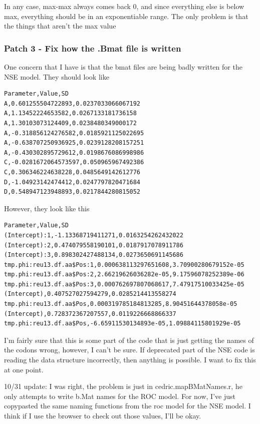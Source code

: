 In any case, max-max always comes back 0, and since everything else is below max, everything should be in an exponentiable range. The only problem is that the things that aren't the max value 

\subsubsection{Patch 3 - Fix how the .Bmat file is written}

One concern that I have is that the bmat files are being badly written for the NSE model. They should look like 

\begin{verbatim}
Parameter,Value,SD
A,0.601255504722893,0.0237033066067192
A,1.13452224653582,0.0267133181736158
A,1.30103073124409,0.0238480349000172
A,-0.318856124276582,0.0185921125022695
A,-0.638707250936925,0.0239128208157251
A,-0.430302895729612,0.0198676086998986
C,-0.0281672064573597,0.050965967492386
C,0.306346224638228,0.0485649142612776
D,-1.04923142474412,0.0247797820471684
D,0.548947123948893,0.0217844280815052
\end{verbatim}

However, they look like this

\begin{verbatim}
Parameter,Value,SD
(Intercept):1,-1.13368719411271,0.0163254262432022
(Intercept):2,0.474079558190101,0.0187917078911786
(Intercept):3,0.898302427488134,0.0273650691145686
tmp.phi:reu13.df.aa$Pos:1,0.000638113297651608,3.70900280679152e-05
tmp.phi:reu13.df.aa$Pos:2,2.66219626036282e-05,9.17596078252389e-06
tmp.phi:reu13.df.aa$Pos:3,0.000762697807068617,7.47917510033425e-05
(Intercept),0.407527027594279,0.0285214413558274
tmp.phi:reu13.df.aa$Pos,0.000319785184813285,8.90451644378058e-05
(Intercept),0.728372367207557,0.0119226668866337
tmp.phi:reu13.df.aa$Pos,-6.65911530134893e-05,1.09884115801929e-05
\end{verbatim}


I'm fairly sure that this is some part of the code that is just getting the names of the codons wrong, however, I can't be sure. If deprecated part of the NSE code is reading the data structure incorrectly, then anything is possible. I want to fix this at one point.

10/31 update: I was right, the problem is just in cedric.mapBMatNames.r, he only attempts to write b.Mat names for the ROC model. For now, I've just copypasted the same naming functions from the roc model for the NSE model. I think if I use the browser to check out those values, I'll be okay.




